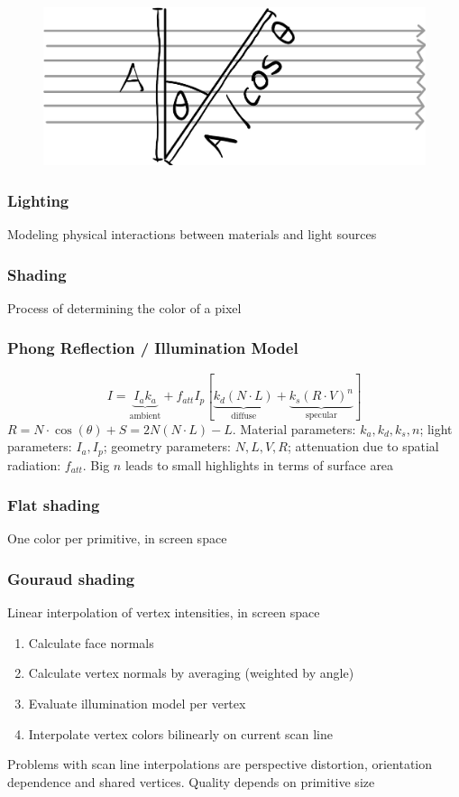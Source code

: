 \documentclass[a4paper,10pt]{article}
\begin{document}
\begin{figure}[ht]
    \centering
    \includegraphics[width=0.4\linewidth]{lamberts-law.jpeg}
\end{figure}
\subsubsection{Lighting} Modeling physical interactions between materials and light sources
\subsubsection{Shading} Process of determining the color of a pixel
\subsubsection{Phong Reflection / Illumination Model} 
\[
    I = \underbrace{I_a k_a}_{\text{ambient}} + f_{att} I_p [\underbrace{k_d(N\cdot L)}_{\text{diffuse}} + \underbrace{k_s(R\cdot V)^n}_{\text{specular}}]
\] 
\( R = N \cdot \cos (\theta) + S = 2N(N\cdot L) - L \).
Material parameters: \( k_a, k_d, k_s, n \);
light parameters: \( I_a, I_p \);
geometry parameters: \( N, L, V, R \); attenuation due to spatial radiation: \( f_{att} \). Big \( n \) leads to small highlights in terms of surface area

\subsubsection{Flat shading} One color per primitive, in screen space
\subsubsection{Gouraud shading} Linear interpolation of vertex intensities, in screen space
\begin{enumerate}
    \item Calculate face normals
    \item Calculate vertex normals by averaging (weighted by angle)
    \item Evaluate illumination model per vertex
    \item Interpolate vertex colors bilinearly on current scan line
\end{enumerate}
Problems with scan line interpolations are perspective distortion, orientation dependence and shared vertices. Quality depends on primitive size
\end{document}
